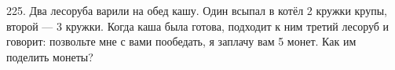 225. Два лесоруба варили на обед кашу. Один всыпал в котёл 2 кружки крупы, второй --- 3 кружки. Когда каша была готова, подходит к ним третий лесоруб и говорит: позвольте мне с вами пообедать, я заплачу вам 5 монет. Как им поделить монеты?\\
